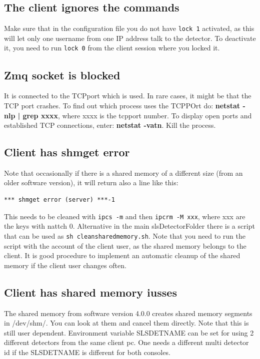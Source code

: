 \documentclass{article}
\begin{document}
\subsection{The client ignores the commands}
Make sure that in the configuration file you do not have {\tt{lock 1}} activated, as this will let only one username from one IP address talk to the detector. 
To deactivate it, you need to run {\tt{lock 0}} from the client session where you locked it. 

\subsection{Zmq socket is blocked}
It is connected to the TCPport which is used. In rare cases, it might be that the TCP port crashes. To find out which process uses the TCPPOrt do: \textbf{netstat -nlp | grep xxxx}, where xxxx is the tcpport number. To display open ports and established TCP connections, enter: \textbf{netstat -vatn}. Kill the process.


\subsection{Client has \textbf{shmget error}}
Note that occasionally if there is a shared memory of a different size (from an older software version), it will return also a line like this:
\begin{verbatim}
*** shmget error (server) ***-1
\end{verbatim}
This needs to be cleaned with {\tt{ipcs -m}} and then {\tt{ipcrm -M xxx}}, where xxx are the keys with nattch 0. Alternative in the main slsDetectorFolder there is a script that can be used as {\tt{sh cleansharedmemory.sh}}. Note that you need to run the script with the account of the client user, as the shared memory belongs to the client. It is good procedure to implement an automatic cleanup of the shared memory if the client user changes often.   

\subsection{Client has shared memory iusses}
The shared memory from software version 4.0.0 creates shared memory segments in /dev/shm/. You can look at them and cancel them directly. Note that this is still user dependent.
Environment variable SLSDETNAME can be set for using 2 different detectors from the same client pc. One needs a different multi detector id if the SLSDETNAME is different for both consoles.
\end{document}
